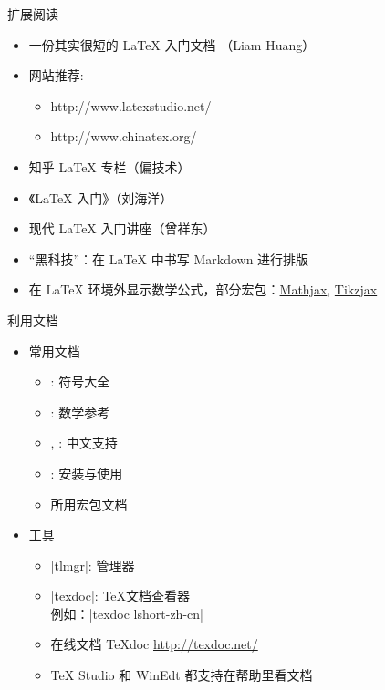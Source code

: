 \begin{frame}{扩展阅读}
  \begin{itemize}
    \item 一份其实很短的 \LaTeX{} 入门文档 （Liam Huang） 
    \item 网站推荐:
      \begin{itemize}
        \item http://www.latexstudio.net/
        \item http://www.chinatex.org/
      \end{itemize}
    \item 知乎 \LaTeX{} 专栏（偏技术）
    \item 《\LaTeX{} 入门》（刘海洋）
    \item 现代 \LaTeX{} 入门讲座（曾祥东）
    \item “黑科技”：在 \LaTeX{} 中书写 Markdown 进行排版 
    \item 在 \LaTeX{} 环境外显示数学公式，部分宏包：\href{https://www.mathjax.org/}{Mathjax}, \href{https://github.com/kisonecat/tikzjax}{Tikzjax}

  \end{itemize}
\end{frame}


\begin{frame}[fragile]{利用文档}
  \begin{itemize}
    \item 常用文档
      \begin{itemize}
        \item {}: 符号大全
        \item {}: 数学参考
        \item {}, : 中文支持
        \item {}: \TL 安装与使用
        \item 所用宏包文档
      \end{itemize}
    \item 工具
      \begin{itemize}
        \item |tlmgr|: \TL 管理器
        \item |texdoc|: \TeX 文档查看器\\
          例如：|texdoc lshort-zh-cn|
        \item 在线文档 \TeX doc \url{http://texdoc.net/}
        \item TeX Studio 和 WinEdt 都支持在帮助里看文档
      \end{itemize}
  \end{itemize}
\end{frame}

